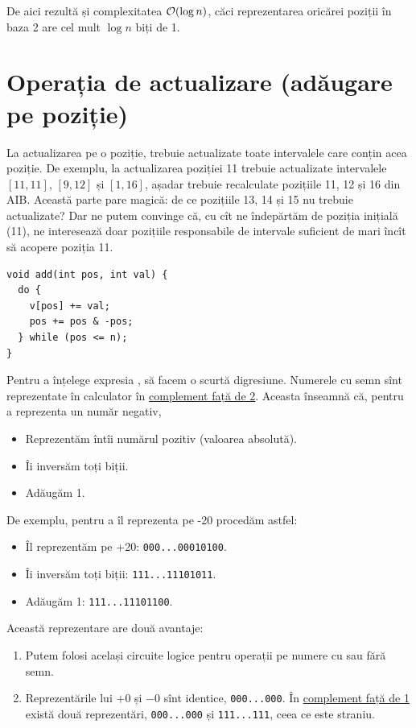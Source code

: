 \documentclass[../main.tex]{subfiles}
\begin{document}
De aici rezultă și complexitatea $\mathcal{O}(\log n)$, căci reprezentarea oricărei poziții în baza 2 are cel mult $\log n$ biți de 1.

\section{Operația de actualizare (adăugare pe poziție)}

La actualizarea pe o poziție, trebuie actualizate toate intervalele care conțin acea poziție. De exemplu, la actualizarea poziției 11 trebuie actualizate intervalele $[11, 11]$, $[9, 12]$ și $[1, 16]$, așadar trebuie recalculate pozițiile 11, 12 și 16 din AIB. Această parte pare magică: de ce pozițiile 13, 14 și 15 nu trebuie actualizate? Dar ne putem convinge că, cu cît ne îndepărtăm de poziția inițială (11), ne interesează doar pozițiile responsabile de intervale suficient de mari încît să acopere poziția 11.

\begin{verbatim}
void add(int pos, int val) {
  do {
    v[pos] += val;
    pos += pos & -pos;
  } while (pos <= n);
}
\end{verbatim}

Pentru a înțelege expresia , să facem o scurtă digresiune. Numerele cu semn sînt reprezentate în calculator în \href{https://en.wikipedia.org/wiki/Two\%27s_complement}{complement față de 2}. Aceasta înseamnă că, pentru a reprezenta un număr negativ,

\begin{itemize}
  \item Reprezentăm întîi numărul pozitiv (valoarea absolută).
  \item Îi inversăm toți biții.
  \item Adăugăm 1.
\end{itemize}

De exemplu, pentru a îl reprezenta pe -20 procedăm astfel:

\begin{itemize}
  \item Îl reprezentăm pe +20: \texttt{000...00010100}.
  \item Îi inversăm toți biții: \texttt{111...11101011}.
  \item Adăugăm 1: \texttt{111...11101100}.
\end{itemize}

Această reprezentare are două avantaje:

\begin{enumerate}
  \item Putem folosi același circuite logice pentru operații pe numere cu sau fără semn.
  \item Reprezentările lui $+0$ și $-0$ sînt identice, \texttt{000...000}. În \href{https://en.wikipedia.org/wiki/Ones\%27_complement}{complement față de 1} există două reprezentări, \texttt{000...000} și \texttt{111...111}, ceea ce este straniu.
\end{enumerate}
\end{document}
